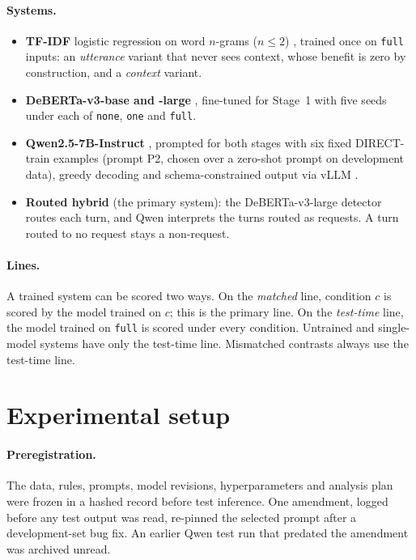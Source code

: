 \documentclass{article}
\begin{document}
\paragraph{Systems.}
\begin{itemize}
  \item \textbf{TF-IDF} logistic regression on word $n$-grams ($n\le2$) \citep{pedregosa2011sklearn},
        trained once on \texttt{full} inputs: an \emph{utterance} variant that never sees
        context, whose benefit is zero by construction, and a \emph{context} variant.
  \item \textbf{DeBERTa-v3-base and -large} \citep{he2023debertav3}, fine-tuned for Stage~1 with
        five seeds under each of \texttt{none}, \texttt{one} and \texttt{full}.
  \item \textbf{Qwen2.5-7B-Instruct} \citep{qwen2024qwen25}, prompted for both stages with six
        fixed DIRECT-train examples (prompt P2, chosen over a zero-shot prompt on development
        data), greedy decoding and schema-constrained output via vLLM \citep{kwon2023vllm}.
  \item \textbf{Routed hybrid} (the primary system): the DeBERTa-v3-large detector routes each
        turn, and Qwen interprets the turns routed as requests. A turn routed to no request stays
        a non-request.
\end{itemize}

\paragraph{Lines.}
A trained system can be scored two ways. On the \emph{matched} line, condition $c$ is scored by
the model trained on $c$; this is the primary line. On the \emph{test-time} line, the model
trained on \texttt{full} is scored under every condition. Untrained and single-model systems have
only the test-time line. Mismatched contrasts always use the test-time line.

\section{Experimental setup}
\label{sec:setup}

\paragraph{Preregistration.}
The data, rules, prompts, model revisions, hyperparameters and analysis plan were frozen in a
hashed record before test inference. One amendment, logged before any test output was read,
re-pinned the selected prompt after a development-set bug fix. An earlier Qwen test run that
predated the amendment was archived unread.
\end{document}
